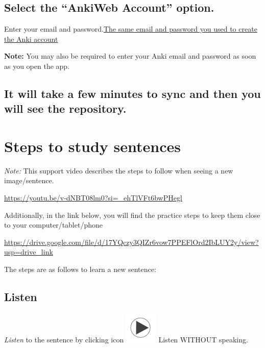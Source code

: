\documentclass[
]{book}
\begin{document}
\hypertarget{select-the-ankiweb-account-option.}{%
\section{Select the ``AnkiWeb Account'' option.}\label{select-the-ankiweb-account-option.}}

Enter your email and password.\protect\hyperlink{cross_3}{The same email and password you used to create the Anki account}

\textbf{Note:} You may also be required to enter your Anki email and password as soon as you open the app.

\hypertarget{it-will-take-a-few-minutes-to-sync-and-then-you-will-see-the-repository.}{%
\section{It will take a few minutes to sync and then you will see the repository.}\label{it-will-take-a-few-minutes-to-sync-and-then-you-will-see-the-repository.}}

\hypertarget{cross_5}{%
\chapter{Steps to study sentences}\label{cross_5}}

\emph{Note:} This support video describes the steps to follow when seeing a new image/sentence.

\url{https://youtu.be/v-dNBT08lm0?si=_ehTlVFt6bwPHegl}

Additionally, in the link below, you will find the practice steps to keep them close to your computer/tablet/phone

\url{https://drive.google.com/file/d/17YQczy3QIZr6vow7PPEFlOrd2IbLUY2y/view?usp=drive_link}

The steps are as follows to learn a new sentence:

\hypertarget{cross_6}{%
\section{Listen}\label{cross_6}}

\emph{Listen} to the sentence by clicking icon \includegraphics{images/play_icon.png} Listen WITHOUT speaking.
\end{document}

